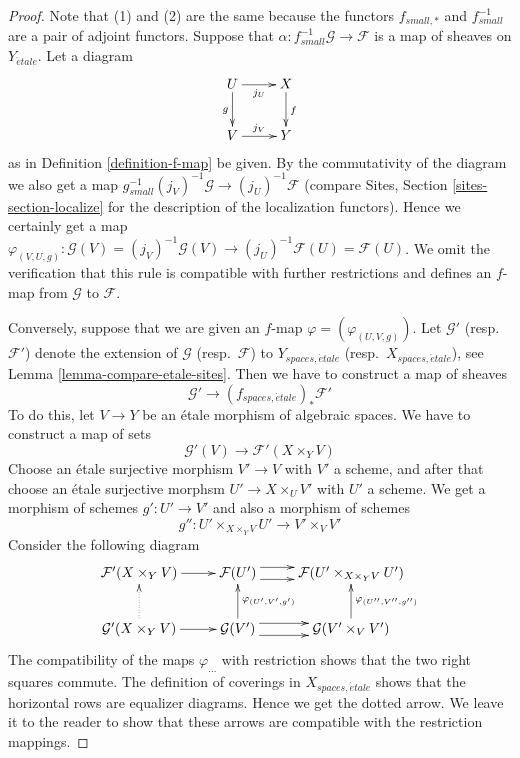 \begin{proof}
Note that (1) and (2) are the same because the functors $f_{small, *}$
and $f_{small}^{-1}$ are a pair of adjoint functors.
Suppose that $\alpha : f_{small}^{-1}\mathcal{G} \to \mathcal{F}$
is a map of sheaves on $Y_{\acute{e}tale}$. Let a diagram
$$
\xymatrix{
U \ar[d]_g \ar[r]_{j_U} & X \ar[d]^f \\
V \ar[r]^{j_V} & Y
}
$$
as in Definition \ref{definition-f-map} be given.
By the commutativity of the diagram we also get a map
$g_{small}^{-1}(j_V)^{-1}\mathcal{G} \to (j_U)^{-1}\mathcal{F}$
(compare Sites, Section \ref{sites-section-localize} for the
description of the localization functors). Hence we certainly
get a map
$\varphi_{(V, U, g)} :
\mathcal{G}(V) = (j_V)^{-1}\mathcal{G}(V) 
\to
(j_U)^{-1}\mathcal{F}(U) = \mathcal{F}(U)$.
We omit the verification that this rule is compatible with
further restrictions and defines an $f$-map from $\mathcal{G}$ to
$\mathcal{F}$.

\medskip\noindent
Conversely, suppose that we are given an $f$-map
$\varphi = (\varphi_{(U, V, g)})$.
Let $\mathcal{G}'$ (resp.\ $\mathcal{F}'$) denote the extension of
$\mathcal{G}$ (resp.\ $\mathcal{F}$) to $Y_{spaces, \acute{e}tale}$
(resp.\ $X_{spaces, \acute{e}tale}$), see
Lemma \ref{lemma-compare-etale-sites}.
Then we have to construct a map of sheaves
$$
\mathcal{G}' \longrightarrow (f_{spaces, \acute{e}tale})_*\mathcal{F}'
$$
To do this, let $V \to Y$ be an \'etale morphism of algebraic spaces.
We have to construct a map of sets
$$
\mathcal{G}'(V) \to \mathcal{F}'(X \times_Y V)
$$
Choose an \'etale surjective morphism $V' \to V$ with $V'$ a scheme,
and after that choose an \'etale surjective morphsm
$U' \to X \times_U V'$ with $U'$ a scheme. We get a morphism of
schemes $g' : U' \to V'$ and also a morphism of schemes
$$
g'' : U' \times_{X \times_Y V} U' \longrightarrow V' \times_V V'
$$
Consider the following diagram
$$
\xymatrix{
\mathcal{F}'(X \times_Y V) \ar[r] &
\mathcal{F}(U') \ar@<1ex>[r] \ar@<-1ex>[r] &
\mathcal{F}(U' \times_{X \times_Y V} U') \\
\mathcal{G}'(X \times_Y V) \ar[r] \ar@{..>}[u] &
\mathcal{G}(V') \ar@<1ex>[r] \ar@<-1ex>[r] \ar[u]_{\varphi_{(U', V', g')}} &
\mathcal{G}(V' \times_V V') \ar[u]_{\varphi_{(U'', V'', g'')}}
}
$$
The compatibility of the maps $\varphi_{...}$
with restriction shows that the two right squares commute.
The definition of coverings in $X_{spaces, \acute{e}tale}$ shows that
the horizontal rows are equalizer diagrams. Hence we get
the dotted arrow. We leave it to the reader to show that these
arrows are compatible with the restriction mappings.
\end{proof}

